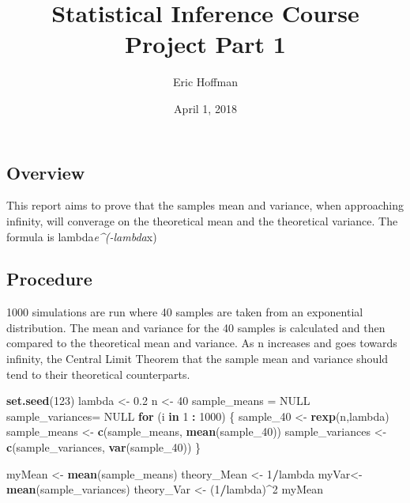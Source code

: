 \documentclass[]{article}
\title{Statistical Inference Course Project Part 1}
\author{Eric Hoffman}
\date{April 1, 2018}
\newenvironment{Shaded}{\begin{snugshade}}{\end{snugshade}}
\newcommand{\KeywordTok}[1]{\textcolor[rgb]{0.13,0.29,0.53}{\textbf{#1}}}
\newcommand{\DecValTok}[1]{\textcolor[rgb]{0.00,0.00,0.81}{#1}}
\newcommand{\FloatTok}[1]{\textcolor[rgb]{0.00,0.00,0.81}{#1}}
\newcommand{\StringTok}[1]{\textcolor[rgb]{0.31,0.60,0.02}{#1}}
\newcommand{\OtherTok}[1]{\textcolor[rgb]{0.56,0.35,0.01}{#1}}
\newcommand{\ControlFlowTok}[1]{\textcolor[rgb]{0.13,0.29,0.53}{\textbf{#1}}}
\newcommand{\OperatorTok}[1]{\textcolor[rgb]{0.81,0.36,0.00}{\textbf{#1}}}
\newcommand{\NormalTok}[1]{#1}
\begin{document}
\maketitle

\subsection{Overview}\label{overview}

This report aims to prove that the samples mean and variance, when
approaching infinity, will converage on the theoretical mean and the
theoretical variance. The formula is lambda\emph{e\^{}(-lambda}x)

\subsection{Procedure}\label{procedure}

1000 simulations are run where 40 samples are taken from an exponential
distribution. The mean and variance for the 40 samples is calculated and
then compared to the theoretical mean and variance. As n increases and
goes towards infinity, the Central Limit Theorem that the sample mean
and variance should tend to their theoretical counterparts.

\begin{Shaded}
\begin{Highlighting}[]
\KeywordTok{set.seed}\NormalTok{(}\DecValTok{123}\NormalTok{)}
\NormalTok{lambda <-}\StringTok{ }\FloatTok{0.2}
\NormalTok{n  <-}\StringTok{ }\DecValTok{40}
\NormalTok{sample_means =}\StringTok{ }\OtherTok{NULL}
\NormalTok{sample_variances=}\StringTok{ }\OtherTok{NULL}
\ControlFlowTok{for}\NormalTok{ (i }\ControlFlowTok{in} \DecValTok{1} \OperatorTok{:}\StringTok{ }\DecValTok{1000}\NormalTok{) \{}
\NormalTok{        sample_}\DecValTok{40}\NormalTok{ <-}\StringTok{ }\KeywordTok{rexp}\NormalTok{(n,lambda)}
\NormalTok{        sample_means <-}\StringTok{ }\KeywordTok{c}\NormalTok{(sample_means, }\KeywordTok{mean}\NormalTok{(sample_}\DecValTok{40}\NormalTok{))}
\NormalTok{        sample_variances <-}\StringTok{ }\KeywordTok{c}\NormalTok{(sample_variances, }\KeywordTok{var}\NormalTok{(sample_}\DecValTok{40}\NormalTok{))}
\NormalTok{\}}

\NormalTok{myMean <-}\StringTok{ }\KeywordTok{mean}\NormalTok{(sample_means)}
\NormalTok{theory_Mean <-}\StringTok{ }\DecValTok{1}\OperatorTok{/}\NormalTok{lambda}
\NormalTok{myVar<-}\StringTok{ }\KeywordTok{mean}\NormalTok{(sample_variances)}
\NormalTok{theory_Var <-}\StringTok{ }\NormalTok{(}\DecValTok{1}\OperatorTok{/}\NormalTok{lambda)}\OperatorTok{^}\DecValTok{2}
\NormalTok{myMean}
\end{Highlighting}
\end{Shaded}
\end{document}

